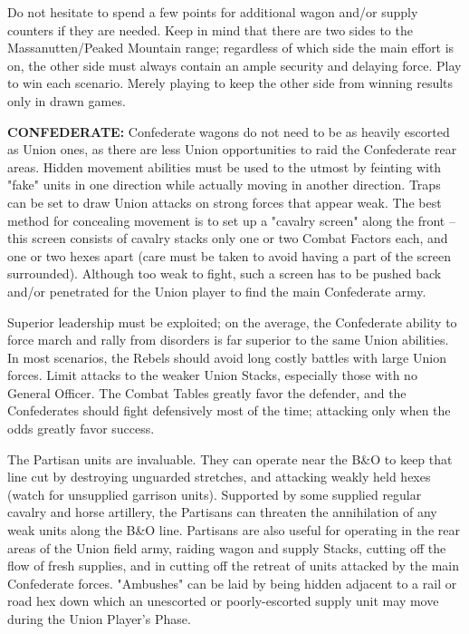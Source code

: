 Do not hesitate to spend a few points for additional wagon and/or supply
counters if they are needed. Keep in mind that there are two sides to the
Massanutten/Peaked Mountain range; regardless of which side the main effort is
on, the other side must always contain an ample security and delaying force.
Play to win each scenario. Merely playing to keep the other side from winning
results only in drawn games.

\textbf{CONFEDERATE:} Confederate wagons do not need to be as heavily escorted as Union
ones, as there are less Union opportunities to raid the Confederate rear areas.
Hidden movement abilities must be used to the utmost by feinting with "fake"
units in one direction while actually moving in another direction. Traps can be
set to draw Union attacks on strong forces that appear weak. The best method
for concealing movement is to set up a "cavalry screen" along the front -- this
screen consists of cavalry stacks only one or two Combat Factors each, and one
or two hexes apart (care must be taken to avoid having a part of the screen
surrounded). Although too weak to fight, such a screen has to be pushed back
and/or penetrated for the Union player to find the main Confederate army.

Superior leadership must be exploited; on the average, the Confederate ability
to force march and rally from disorders is far superior to the same
Union abilities. In most scenarios, the Rebels should avoid long costly
battles with large Union forces. Limit attacks to the weaker Union Stacks,
especially those with no General Officer. The Combat Tables greatly favor the
defender, and the Confederates should fight defensively most of the time;
attacking only when the odds greatly favor success.

The Partisan units are invaluable. They can operate near the B\&O to keep that
line cut by destroying unguarded stretches, and attacking weakly held
hexes (watch for unsupplied garrison units). Supported by some supplied
regular cavalry and horse artillery, the Partisans can threaten the
annihilation of any weak units along the B\&O line. Partisans are also useful
for operating in the rear areas of the Union field army, raiding wagon and
supply Stacks, cutting off the flow of fresh supplies, and in cutting off the
retreat of units attacked by the main Confederate forces. "Ambushes" can be
laid by being hidden adjacent to a rail or road hex down which an unescorted or
poorly-escorted supply unit may move during the Union Player's Phase.

